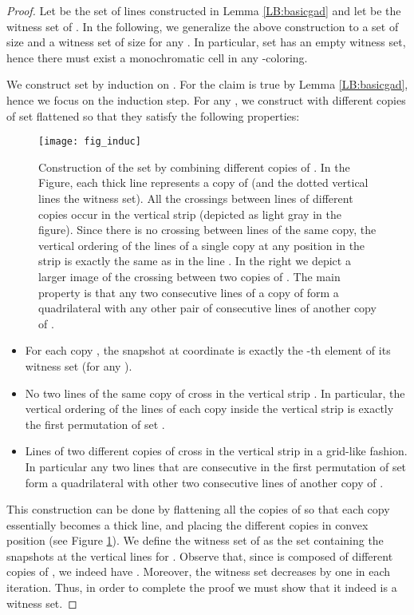 \documentclass[11pt,a4paper]{article}
\begin{document}
\begin{proof}
Let  be the set of lines constructed in Lemma \ref{LB:basicgad} and let  be the witness set of . In the following, we generalize the above construction to a set  of size   and a witness set  of size  for any . In particular, set  has an empty  witness set, hence there must exist a monochromatic cell in any -coloring.

We construct set  by induction on . For  the claim is true by Lemma \ref{LB:basicgad}, hence we focus on the induction step. For any , we construct  with  different copies of set  flattened so that they satisfy the following properties:

\begin{figure}
   \begin{center}
     \texttt{[image: fig\_induc]}
     \caption{Construction of the set  by combining  different copies of . In the Figure, each thick line represents a copy of  (and the dotted vertical lines the witness set). All the crossings between lines of different copies occur in the vertical strip  (depicted as light gray in the figure). Since there is no crossing between lines of the same copy, the vertical ordering of the lines of a single copy at any position in the strip is exactly the same as in the line .
     In the right we depict a larger image of the crossing between two copies of . The main property is that any two consecutive lines of a copy of  form a quadrilateral with any other pair of consecutive lines of another copy of .}
     \label{fig_induc}
   \end{center}
\end{figure}
\begin{itemize}
\item  For each copy , the snapshot at coordinate  is exactly the -th element of its witness set (for any ).
\item  No two lines of the same copy  of  cross in the vertical strip . In particular,  the vertical ordering of the lines of each copy inside the vertical strip is exactly the first permutation of set .
\item  Lines of two different copies of  cross in the  vertical strip  in a grid-like fashion. In particular any two lines that are consecutive in the first permutation of set  form a quadrilateral with other two consecutive lines of another copy of .
\end{itemize}
This construction can be done by flattening all the copies of  so that each copy essentially becomes a thick line, and placing the different copies in convex position (see Figure \ref{fig_induc}). We define the witness set  of  as the set containing the snapshots at the vertical lines  for . Observe that, since  is composed of  different copies of , we indeed have . Moreover, the witness set decreases by one in each iteration. Thus, in order to complete the proof we must show that it indeed is a witness set.


\end{proof}
\end{document}
